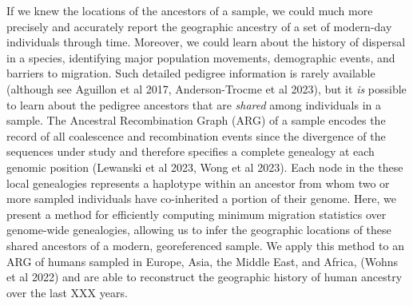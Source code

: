 If we knew the locations of the ancestors of a sample, 
we could much more precisely and accurately report the geographic ancestry 
of a set of modern-day individuals through time.
Moreover, we could learn about the history of dispersal in a species, 
identifying major population movements, 
demographic events, and 
barriers to migration.
Such detailed pedigree information is rarely available
(although see Aguillon et al 2017, Anderson-Trocme et al 2023), 
but it \emph{is} possible to learn about the pedigree ancestors that are 
\emph{shared} among individuals in a sample.
The Ancestral Recombination Graph (ARG) of a sample 
encodes the record of all coalescence and recombination events since the 
divergence of the sequences under study 
and therefore specifies a complete genealogy at each genomic position 
(Lewanski et al 2023, Wong et al 2023).
Each node in the these local genealogies represents a haplotype within 
an ancestor from whom two or more sampled individuals have 
co-inherited a portion of their genome.
Here, we present a method for efficiently computing 
minimum migration statistics over genome-wide genealogies, 
allowing us to infer the geographic locations of these shared ancestors 
of a modern, georeferenced sample.
We apply this method to an ARG of humans sampled in Europe, Asia, the Middle East, and Africa, 
(Wohns et al 2022) 
and are able to reconstruct the geographic history of human ancestry over the last XXX years.

